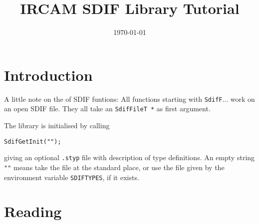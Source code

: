 \documentclass{article}
\title  {IRCAM SDIF Library Tutorial}
\author {\link{mailto:schwarz@ircam.fr}{Diemo Schwarz}}
\date   {\today}
\renewcommand{\code}         [1] {{\upshape\texttt{#1}}}
\begin{document}
\maketitle



\section {Introduction}

A little note on the  of SDIF funtions: All functions
starting with \code{SdifF}... work on an open SDIF file.  They all take an
\code{SdifFileT *} as first argument.

The library is initialised by calling

\begin{alltt}
SdifGetInit ("");
\end{alltt}

giving an optional \code{.styp} file with description of type definitions.  An
empty string \code{""} means take the file at the standard place, or use the
file given by the environment variable \code{SDIFTYPES}, if it exists.


\section {Reading}

\end{document}
